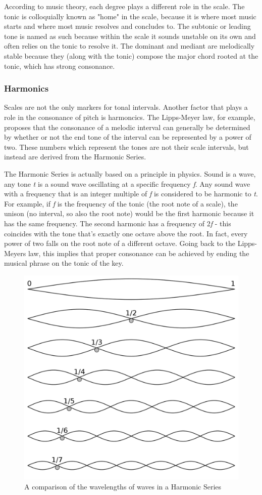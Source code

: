 According to music theory, each degree plays a different role in the scale. The tonic is
colloquially known as "home" in the scale, because it is where most music starts and where most
music resolves and concludes to. The subtonic or leading tone is named as such because within the
scale it sounds unstable on its own and often relies on the tonic to resolve it. The dominant and
mediant are melodically stable because they (along with the tonic) compose the major chord rooted
at the tonic, which has strong consonance.

\subsubsection{Harmonics}

Scales are not the only markers for tonal intervals. Another factor that plays a role in the
consonance of pitch is harmoncics. The Lipps-Meyer law, for example, proposes that the consonance
of a melodic interval can generally be determined by whether or not the end tone of the interval
can be represented by a power of two.\autocite{musiciansArithmetic} These numbers which represent
the tones are not their scale intervals, but instead are derived from the Harmonic Series.

The Harmonic Series is actually based on a principle in physics. Sound is a wave, any tone \textit{t}
is a sound wave oscillating at a specific frequency \textit{f}. Any sound wave with a frequency
that is an integer multiple of \textit{f} is considered to be harmonic to \textit{t}.\autocite{intervals} For example,
if \textit{f} is the frequency of the tonic (the root note of a scale), the unison (no interval,
so also the root note) would be the first harmonic because it has the same frequency. The second
harmonic has a frequency of 2\textit{f} - this coincides with the tone that's exactly one octave
above the root. In fact, every power of two falls on the root note of a different octave. Going
back to the Lipps-Meyers law, this implies that proper consonance can be achieved by ending the
musical phrase on the tonic of the key.

\begin{figure}[h!]
  \centering
  \includegraphics[width=0.5\linewidth]{image/Harmonics.png}
  \caption{A comparison of the wavelengths of waves in a Harmonic Series \autocite{harmonicSeries}}
\end{figure}

